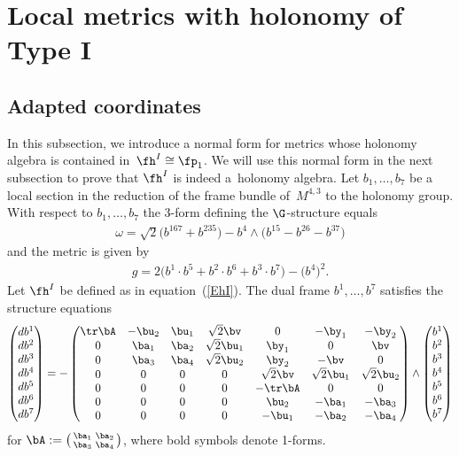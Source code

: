 \section{Local metrics with holonomy of Type I} \label{S2}
\subsection{Adapted coordinates}
In this subsection, we introduce a normal form for metrics whose holonomy algebra is contained in~$\fh^I\cong\fp_1$. We will use this normal form in the next subsection to prove that $\fh^I$ is indeed a~holonomy algebra. Let $b_1,\dots,b_7$ be a local section in the reduction of the frame bundle of~$M^{4,3}$ to the holonomy group. With respect to $b_1,\dots,b_7$ the 3-form defining the $\G$-structure equals
\begin{gather*}
\omega=\sqrt 2\big(b^{167}+b^{235}\big)-b^4\wedge \big(b^{15}-b^{26}-b^{37}\big)
\end{gather*}
and the metric is given by
\begin{gather}
g=2\big(b^1\cdot b^5+b^2\cdot b^6+b^3\cdot b^7\big)- \big(b^4\big)^2. \label{Eip}
\end{gather}
Let $\fh^I$ be defined as in equation~(\ref{EhI}). The dual frame $b^1,\dots,b^7$ satisfies the structure equations
\begin{gather}\label{Ese}
\left(\begin{matrix} db^1\\db^2\\db^3\\db^4\\db^5\\db^6\\db^7\end{matrix}\right) = -\left(
\begin{matrix}
\tr \bA &-\bu_2&\bu_1&\sqrt 2 \bv&0&-\by_1&-\by_2\\
0&\ba_1&\ba_2&\sqrt 2 \bu_1&\by_1&0&\bv\\
0&\ba_3&\ba_4&\sqrt 2 \bu_2&\by_2&-\bv&0\\
0&0&0&0&\sqrt 2 \bv&\sqrt 2 \bu_1&\sqrt 2 \bu_2\\
0&0&0&0&-\tr \bA&0&0\\
0&0&0&0&\bu_2&-\ba_1&-\ba_3\\
0&0&0&0&-\bu_1&-\ba_2&-\ba_4
	\end{matrix}\right) \wedge \left(\begin{matrix} b^1\\b^2\\b^3\\b^4\\b^5\\b^6\\b^7\end{matrix}\right)
\end{gather}	
for	$ \bA:=\left(\begin{smallmatrix} \ba_1&\ba_2\\ \ba_3&\ba_4\end{smallmatrix}\right)$, where bold symbols denote 1-forms.

